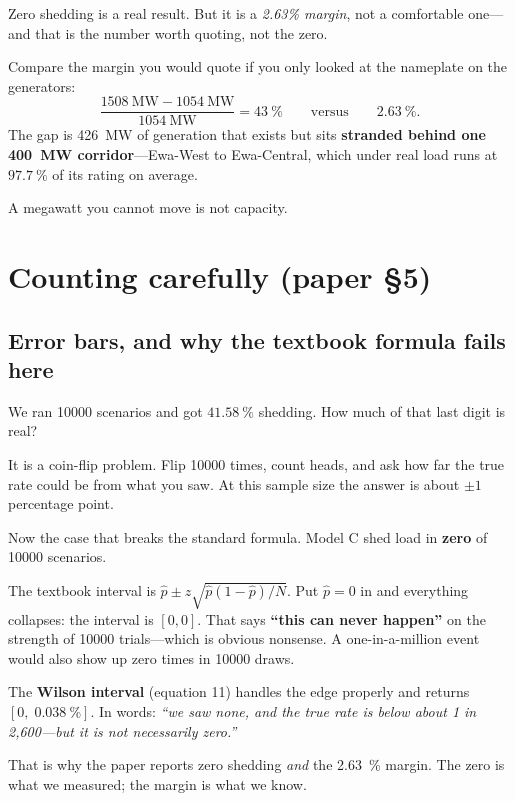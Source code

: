 \documentclass[11pt,a4paper]{article}
\begin{document}
Zero shedding is a real result. But it is a \emph{2.63\% margin}, not a
comfortable one---and that is the number worth quoting, not the zero.

\begin{watch}
Compare the margin you would quote if you only looked at the nameplate on the
generators:
\[
\frac{\SI{1508}{\mega\watt} - \SI{1054}{\mega\watt}}{\SI{1054}{\mega\watt}}
= \SI{43}{\percent} \qquad\text{versus}\qquad \SI{2.63}{\percent}.
\]
The gap is \SI{426}{\mega\watt} of generation that exists but sits
\textbf{stranded behind one \SI{400}{\mega\watt} corridor}---Ewa-West to
Ewa-Central, which under real load runs at $\SI{97.7}{\percent}$ of its rating
on average.

A megawatt you cannot move is not capacity.
\end{watch}

\section{Counting carefully (paper \S5)}

\subsection{Error bars, and why the textbook formula fails here}

We ran \num{10000} scenarios and got $\SI{41.58}{\percent}$ shedding. How much of
that last digit is real?

\begin{anchor}
It is a coin-flip problem. Flip \num{10000} times, count heads, and ask how far
the true rate could be from what you saw. At this sample size the answer is
about $\pm 1$ percentage point.
\end{anchor}

\begin{watch}
Now the case that breaks the standard formula. Model C shed load in
\textbf{zero} of \num{10000} scenarios.

The textbook interval is $\hat p \pm z\sqrt{\hat p (1-\hat p)/N}$. Put
$\hat p = 0$ in and everything collapses: the interval is
$[0, 0]$. That says \textbf{``this can never happen''} on the strength of
\num{10000} trials---which is obvious nonsense. A one-in-a-million event would
also show up zero times in \num{10000} draws.

The \textbf{Wilson interval} (equation 11) handles the edge properly and returns
$[0,\; \SI{0.038}{\percent}]$. In words: \emph{``we saw none, and the true rate
is below about 1 in 2{,}600---but it is not necessarily zero.''}

That is why the paper reports zero shedding \emph{and} the
\SI{2.63}{\percent} margin. The zero is what we measured; the margin is what we
know.
\end{watch}
\end{document}

